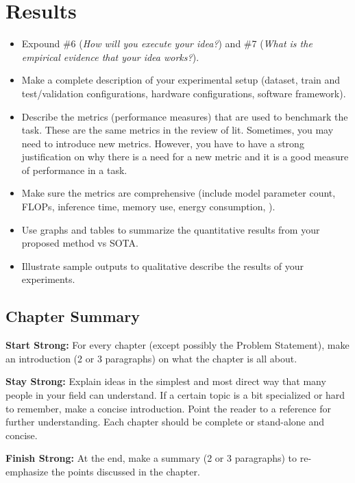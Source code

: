 \chapter{Results}
\label{ch:results}

\begin{itemize}
    \item Expound \#6 (\emph{How will you execute your idea?}) and \#7 (\emph{What is the empirical evidence that your idea works?}).
    \item Make a complete description of your experimental setup (\eg dataset, train and test/validation configurations, hardware configurations, software framework).
    \item Describe the metrics (performance measures) that are used to benchmark the task. These are the same metrics in the review of lit. Sometimes, you may need to introduce new metrics. However, you have to have a strong justification on why there is a need for a new metric and it is a good measure of performance in a task.
    \item Make sure the metrics are comprehensive (\eg include model parameter count, FLOPs, inference time, memory use, energy consumption, \etc).
    \item Use graphs and tables to summarize the quantitative results from your proposed method vs SOTA.
    \item Illustrate sample outputs to qualitative describe the results of your experiments.
\end{itemize}

\section{Chapter Summary}

\textbf{Start Strong:} For every chapter (except possibly the Problem Statement), make an introduction (2 or 3 paragraphs) on what the chapter is all about.

\textbf{Stay Strong:} Explain ideas in the simplest and most direct way that many people in your field can understand. If a certain topic is a bit specialized or hard to remember, make a concise introduction. Point the reader to a reference for further understanding. Each chapter should be complete or stand-alone and concise.

\textbf{Finish Strong:} At the end, make a summary (2 or 3 paragraphs) to re-emphasize the points discussed in the chapter.
